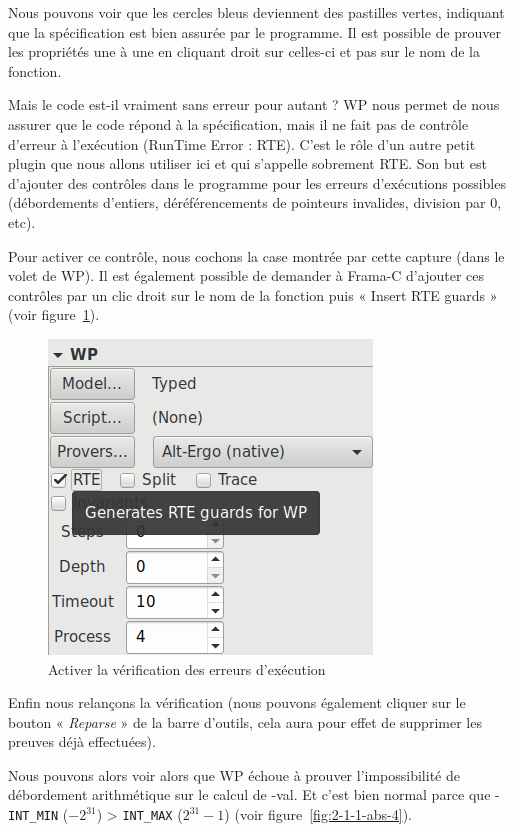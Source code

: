 \documentclass[12pt,francais,]{scrbook}
\begin{document}
Nous pouvons voir que les cercles bleus deviennent des pastilles vertes,
indiquant que la spécification est bien assurée par le programme. Il est
possible de prouver les propriétés une à une en cliquant droit sur
celles-ci et pas sur le nom de la fonction.

Mais le code est-il vraiment sans erreur pour autant ? WP nous permet de
nous assurer que le code répond à la spécification, mais il ne fait pas
de contrôle d'erreur à l'exécution (RunTime Error : RTE). C'est le rôle
d'un autre petit plugin que nous allons utiliser ici et qui s'appelle
sobrement RTE. Son but est d'ajouter des contrôles dans le programme
pour les erreurs d'exécutions possibles (débordements d'entiers,
déréférencements de pointeurs invalides, division par 0, etc).

Pour activer ce contrôle, nous cochons la case montrée par cette capture
(dans le volet de WP). Il est également possible de demander à Frama-C
d'ajouter ces contrôles par un clic droit sur le nom de la fonction puis
« Insert RTE guards » (voir figure~\ref{fig:2-1-1-abs-3}).

\begin{figure}[htbp]
\centering
\includegraphics[scale=0.5]{2-1-1-abs-3.png}
\caption{Activer la vérification des erreurs d'exécution}
\label{fig:2-1-1-abs-3}
\end{figure}

Enfin nous relançons la vérification (nous pouvons également cliquer sur
le bouton « \emph{Reparse} » de la barre d'outils, cela aura pour effet
de supprimer les preuves déjà effectuées).

Nous pouvons alors voir alors que WP échoue à prouver l'impossibilité de
débordement arithmétique sur le calcul de -val. Et c'est bien normal
parce que -\texttt{INT\_MIN} (\(-2^{31}\)) \textgreater{}
\texttt{INT\_MAX} (\(2^{31}-1\)) (voir figure~\ref{fig:2-1-1-abs-4}).
\end{document}

